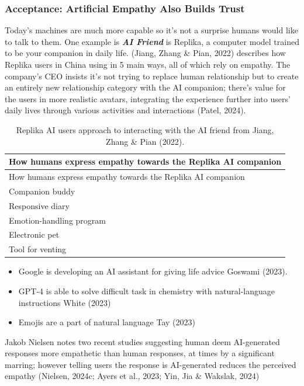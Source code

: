 \documentclass[
  letterpaper,
  DIV=11,
  numbers=noendperiod]{scrartcl}
\providecommand{\tightlist}{%
  \setlength{\itemsep}{0pt}\setlength{\parskip}{0pt}}\usepackage{longtable,booktabs,array}
\begin{document}
\subsubsection{Acceptance: Artificial Empathy Also Builds
Trust}\label{acceptance-artificial-empathy-also-builds-trust}

Today's machines are much more capable so it's not a surprise humans
would like to talk to them. One example is \textbf{\emph{AI Friend}} is
Replika, a computer model trained to be your companion in daily life.
(Jiang, Zhang \& Pian, 2022) describes how Replika users in China using
in 5 main ways, all of which rely on empathy. The company's CEO insists
it's not trying to replace human relationship but to create an entirely
new relationship category with the AI companion; there's value for the
users in more realistic avatars, integrating the experience further into
users' daily lives through various activities and interactions (Patel,
2024).

\begin{longtable}[]{@{}l@{}}
\caption{Replika AI users approach to interacting with the AI friend
from Jiang, Zhang \& Pian (2022).}\tabularnewline
\toprule\noalign{}
How humans express empathy towards the Replika AI companion \\
\midrule\noalign{}
\endfirsthead
\toprule\noalign{}
How humans express empathy towards the Replika AI companion \\
\midrule\noalign{}
\endhead
\bottomrule\noalign{}
\endlastfoot
Companion buddy \\
Responsive diary \\
Emotion-handling program \\
Electronic pet \\
Tool for venting \\
\end{longtable}

\begin{itemize}
\tightlist
\item
  Google is developing an AI assistant for giving life advice Goswami
  (2023).
\item
  GPT-4 is able to solve difficult task in chemistry with
  natural-language instructions White (2023)
\item
  Emojis are a part of natural language Tay (2023)
\end{itemize}

Jakob Nielsen notes two recent studies suggesting human deem
AI-generated responses more empathetic than human responses, at times by
a significant marring; however telling users the response is
AI-generated reduces the perceived empathy (Nielsen, 2024c; Ayers et
al., 2023; Yin, Jia \& Wakslak, 2024)
\end{document}
